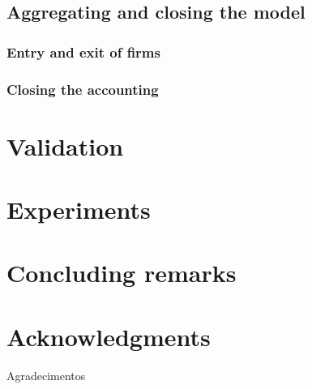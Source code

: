 \documentclass{SelfArx}
\begin{document}
\subsection{Aggregating and closing the model}
\label{sec:org44a6e70}

\subsubsection{Entry and exit of firms}
\label{sec:org53d204c}
\subsubsection{Closing the accounting}
\label{sec:org7f56089}


\section{Validation}
\label{sec:validation:ch_super}
\section{Experiments}
\label{sec:experiments:ch_super}
\section{Concluding remarks}
\label{sec:conclusion:ch_super}

\section{Acknowledgments}
\label{sec:org380c3c8}

Agradecimentos



\printbibliography
\end{document}

